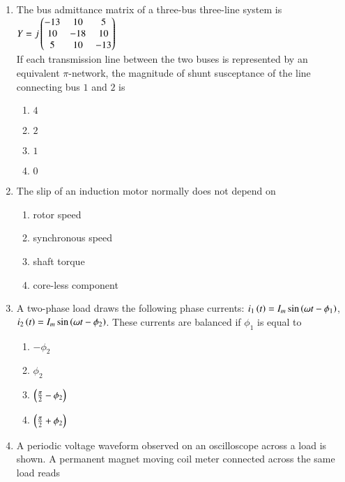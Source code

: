 \documentclass[journal]{IEEEtran}
\begin{document}
\begin{enumerate}
{\begin{multicols}{4}
\begin{enumerate}
\item $\frac{1}{3}\textless\abs{z}\textless 1$
\end{enumerate}
\end{multicols}
}
\item{
The bus admittance matrix of a three-bus three-line system is\\ $Y=j\begin{pmatrix}-13&10&5\\10&-18&10\\5&10&-13\end{pmatrix}$\\If each transmission line between the two buses is represented by an equivalent $\pi$-network, the magnitude of shunt susceptance of the line connecting bus $1$ and $2$ is
\begin{multicols}{4}
\begin{enumerate}
\item $4$
\item $2$
\item $1$
\item $0$
\end{enumerate}
\end{multicols}
}
\item{
The slip of an induction motor normally does not depend on 
\begin{multicols}{2}
\begin{enumerate}
\item rotor speed
\item synchronous speed
\item shaft torque
\item core-less component
\end{enumerate}
\end{multicols}
}
\item{
A two-phase load draws the following phase currents: $i_1\left(t\right)=I_m\sin\left(\omega t-\phi_1\right)$, $i_2\left(t\right)=I_m\sin\left(\omega t-\phi_2\right)$. These currents are balanced if $\phi_1$ is equal to
\begin{multicols}{4}
\begin{enumerate}
\item $-\phi_2$
\item $\phi_2$
\item $\left(\frac{\pi}{2}-\phi_2\right)$
\item $\left(\frac{\pi}{2}+\phi_2\right)$
\end{enumerate}
\end{multicols}
}
\item{
A periodic voltage waveform observed on an oscilloscope across a load is shown. A permanent magnet moving coil meter connected across the same load reads
}
\end{enumerate}
\end{document}
